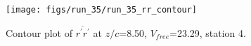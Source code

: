 \begin{figure}[H]
\centering
\texttt{[image: figs/run\_35/run\_35\_rr\_contour]}
\caption{Contour plot of $\overline{r^\prime r^\prime}$ at $z/c$=8.50, $V_{free}$=23.29, station 4.}
\label{fig:run_35_rr_contour}
\end{figure}


